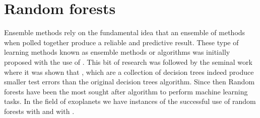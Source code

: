 \section{Random forests} 
Ensemble methods rely on the fundamental idea that an ensemble of methods when polled together produce a reliable and predictive result.
These type of learning methods known as ensemble methods or algorithms was initially proposed with the use of \citep[decision trees, ][]{breiman1998arcing}.
This bit of research was followed by the seminal work where it was shown that \citep[Random forests, ][]{breiman2001random}, which are a collection of decision trees indeed produce smaller test errors than the original decision trees algorithm.
Since then Random forests have been the most sought after algorithm to perform machine learning tasks.
In the field of exoplanets we have instances of the successful use of random forests with \citep[SOFIRF, ][]{2018Gomez} and with \citep[RF, ][]{2020Fisher}.

